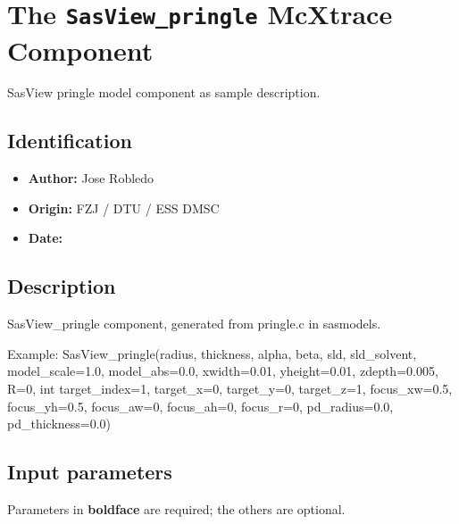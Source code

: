 \section{The \texttt{SasView\_pringle} McXtrace Component}
SasView pringle model component as sample description.

\subsection*{Identification}
\begin{itemize}
  \item \textbf{Author:} Jose Robledo
  \item \textbf{Origin:} FZJ / DTU / ESS DMSC
  \item \textbf{Date:} 
\end{itemize}

\subsection*{Description}
SasView\_pringle component, generated from pringle.c in sasmodels.

Example: SasView\_pringle(radius, thickness, alpha, beta, sld, sld\_solvent, model\_scale=1.0, model\_abs=0.0, xwidth=0.01, yheight=0.01, zdepth=0.005, R=0, int target\_index=1, target\_x=0, target\_y=0, target\_z=1, focus\_xw=0.5, focus\_yh=0.5, focus\_aw=0, focus\_ah=0, focus\_r=0, pd\_radius=0.0, pd\_thickness=0.0)

\subsection*{Input parameters}
Parameters in \textbf{boldface} are required; the others are optional.

